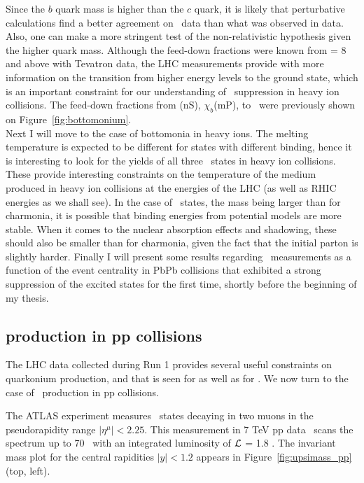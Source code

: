 Since the $b$ quark mass is higher than the $c$ quark, it is likely that
perturbative calculations find a better agreement on \PgU~data than
what was observed in \Jpsi data. Also, one can make a more stringent test of the
non-relativistic hypothesis given the higher quark mass.
Although the feed-down fractions were known from \pt = 8 \GeVc and
above with Tevatron data, the LHC measurements provide with more
information on the transition from higher energy levels to the ground
state, which is an important constraint for our understanding of
\PgU~suppression in heavy ion collisions. The feed-down fractions from
\PgU(nS), $\chi_{b}$(mP), to \PgUa~were previously shown on
Figure~\ref{fig:bottomonium}.
\\
Next I will move to the case of bottomonia in heavy ions. The melting
temperature is expected to be different for states with different
binding, hence it is interesting to look for the yields of all three \PgU~states in
heavy ion collisions. These provide interesting constraints on the temperature of
the medium produced in heavy ion collisions at the energies of the LHC (as well
as RHIC energies as we shall see). In the case of \PgU~states, the
mass being larger than for charmonia, it is possible that binding
energies from potential models are more stable. When it comes to the nuclear
absorption effects and shadowing, these should also be smaller than
for charmonia, given the fact that the initial parton is slightly
harder. Finally I will present some results regarding \PgU\
measurements as a function of the event centrality in PbPb collisions
that exhibited a strong suppression of the excited states for the
first time, shortly before the beginning of my thesis.

\subsection{\texorpdfstring{\PgU}{Y} production in pp collisions}
The LHC data collected during Run 1 provides several useful
constraints on quarkonium production, and that is seen for \Jpsi
as well as for \PgU. We now turn to the case of \PgU~production in pp collisions.



The ATLAS experiment measures \PgU~states decaying in two muons in the
pseudorapidity range $\vert\eta^{\mu}\vert < 2.25$. %
This measurement in 7 TeV pp data~\cite{atlasUpsilon7tev} 
scans the \pt spectrum up to 70 \GeVc~with an integrated luminosity of $\mathcal{L}$ = 1.8 \invfb. The invariant mass plot for the central rapidities
$\vert y\vert <
1.2$ appears in Figure~\ref{fig:upsimass_pp} (top, left). 



